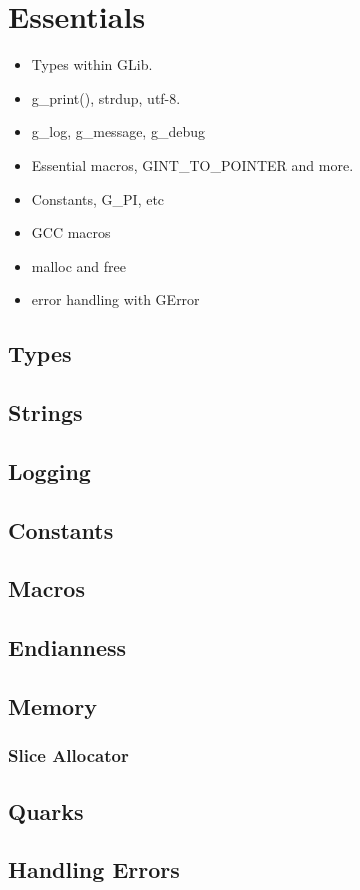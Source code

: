 \chapter{Essentials}

\begin{itemize}
\item Types within GLib.
\item g\_print(), strdup, utf-8.
\item g\_log, g\_message, g\_debug
\item Essential macros, GINT\_TO\_POINTER and more.
\item Constants, G\_PI, etc
\item GCC macros
\item malloc and free
\item error handling with GError
\end{itemize}

\section{Types}

\section{Strings}

\section{Logging}

\section{Constants}

\section{Macros}

\section{Endianness}

\section{Memory}
\subsection{Slice Allocator}

\section{Quarks}

\section{Handling Errors}

